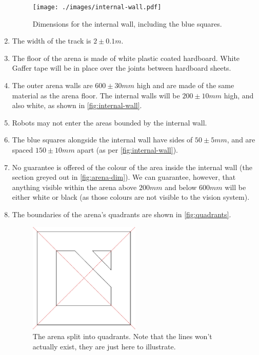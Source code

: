 \begin{enumerate}
\begin{figure}
  \texttt{[image: ./images/internal-wall.pdf]}
  \caption{\label{fig:internal-wall}Dimensions for the internal wall, including the blue squares.}
\end{figure}

\item The width of the track is $2\pm0.1m$.
\item The floor of the arena is made of white plastic coated hardboard.
 White Gaffer tape will be in place over the joints between hardboard sheets.
\item The outer arena walls are $600\pm30mm$ high and are made of the same material as the arena floor.
 The internal walls will be $200\pm10mm$ high, and also white, as shown in \autoref{fig:internal-wall}.
\item Robots may not enter the areas bounded by the internal wall.
\item The blue squares alongside the internal wall have sides of $50\pm5mm$, and are spaced $150\pm10mm$ apart (as per \autoref{fig:internal-wall}).
\item No guarantee is offered of the colour of the area inside the internal wall (the section greyed out in \autoref{fig:arena-dim}).
 We can guarantee, however, that anything visible within the arena above $200mm$ and below $600mm$ will be either white or black (as those colours are not visible to the vision system).
\item The boundaries of the arena's quadrants are shown in \autoref{fig:quadrants}.

\begin{figure}
\begin{center}
  \includegraphics[keepaspectratio, clip, width=0.5\textwidth]{./images/quadrants.pdf}
  \caption{\label{fig:quadrants}The arena split into quadrants.
           Note that the lines won't actually exist, they are just here to illustrate.}
\end{center}
\end{figure}


\end{enumerate}
